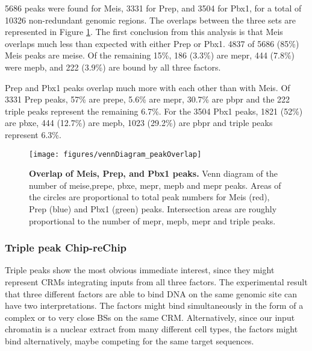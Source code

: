 5686 peaks were found for Meis, 3331 for Prep, and 3504 for Pbx1, for a total of 10326 non-redundant genomic regions. The overlaps between the three sets are represented in Figure \ref{fig:peakOverlap}. The first conclusion from this analysis is that Meis overlaps much less than expected with either Prep or Pbx1. 4837 of 5686 (85\%) Meis peaks are \ac{meise}. Of the remaining 15\%, 186 (3.3\%) are \ac{mepr}, 444 (7.8\%) were \ac{mepb}, and 222 (3.9\%) are bound by all three factors. 

Prep and Pbx1 peaks overlap much more with each other than with Meis. Of 3331 Prep peaks, 57\% are \ac{prepe},  5.6\% are \ac{mepr}, 30.7\% are \ac{pbpr} and the 222 triple peaks represent the remaining 6.7\%. For the 3504 Pbx1 peaks, 1821 (52\%) are \ac{pbxe}, 444 (12.7\%) are \ac{mepb}, 1023 (29.2\%) are \ac{pbpr} and triple peaks represent 6.3\%. 




\begin{figure}[]
  
  \centering
  \label{fig:peakOverlap}
  \texttt{[image: figures/vennDiagram\_peakOverlap]}
  \caption[Overlap of Meis, Prep, and Pbx1 peaks]{\textbf{Overlap of Meis, Prep, and Pbx1 peaks.} Venn diagram of the number of \ac{meise},\ac{prepe}, \ac{pbxe}, \ac{mepr}, \ac{mepb} and \ac{mepr} peaks. Areas of the circles are proportional to total peak numbers for Meis (red), Prep (blue) and Pbx1 (green) peaks. Intersection areas are roughly proportional to the number of \ac{mepr}, \ac{mepb}, \ac{mepr} and triple peaks.}
\end{figure}



\subsubsection{Triple peak Chip-reChip}

Triple peaks show the most obvious immediate interest, since they might represent \acp{CRM} integrating inputs from all three factors. The experimental result that three different factors are able to bind DNA on the same genomic site can have two interpretations. The factors might bind simultaneously in the form of a complex or to very close \acp{BS} on the same \ac{CRM}. Alternatively, since our input chromatin is a nuclear extract from many different cell types, the factors might bind alternatively, maybe competing for the same target sequences.

